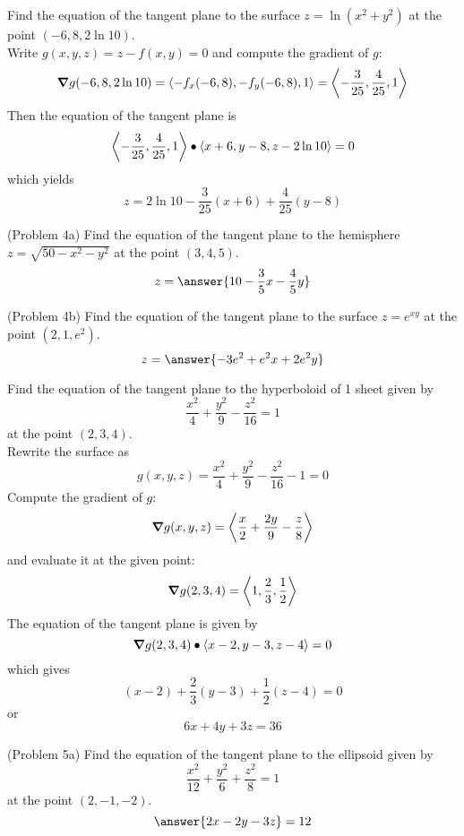 \documentclass[handout]{ximera}
\begin{document}
\begin{example}[Example 4]
Find the equation of the tangent plane to the surface $z = \ln(x^2 + y^2)$ at the point $(-6, 8, 2\ln 10)$.\\
Write $g(x, y, z) = z - f(x,y) = 0$ and compute the gradient of $g$:
\[
\boldsymbol\nabla g(-6, 8, 2\ln 10) = \left\langle -f_x(-6, 8), -f_y(-6, 8), 1\right\rangle = \left\langle -\frac{3}{25}, \frac{4}{25}, 1\right\rangle
\]
Then the equation of the tangent plane is
\[
\left\langle -\frac{3}{25}, \frac{4}{25}, 1\right\rangle \bullet \left\langle x+6, y-8, z-2\ln 10\right\rangle = 0
\]
which yields
\[
z = 2\ln 10 - \frac{3}{25}(x+6) +\frac{4}{25}(y-8)
\]
\end{example}

\begin{problem}(Problem 4a)
Find the equation of the tangent plane to the hemisphere $z = \sqrt{50 -x^2 - y^2}$ at the point $(3, 4, 5)$.\\
\[
z = \answer{10-\frac35 x - \frac45 y}
\]

\end{problem}


\begin{problem}(Problem 4b)
Find the equation of the tangent plane to the surface $z =e^{xy}$ at the point $(2, 1, e^2)$.\\
\[
z = \answer{-3e^2 + e^2 x + 2e^2 y}
\]
\end{problem}

\begin{example}[Example 5]
Find the equation of the tangent plane to the hyperboloid of 1 sheet given by 
\[
\frac{x^2}{4} + \frac{y^2}{9} - \frac{z^2}{16} = 1
\]
at the point $(2, 3, 4)$.\\
Rewrite the surface as
\[
g(x,y,z) = \frac{x^2}{4} + \frac{y^2}{9} - \frac{z^2}{16} - 1 = 0
\]
Compute the gradient of $g$:
\[
\boldsymbol\nabla g(x,y,z) = \left\langle \frac{x}{2} + \frac{2y}{9} - \frac{z}{8}\right\rangle
\]
and evaluate it at the given point:
\[
\boldsymbol\nabla g(2,3,4) = \left\langle 1, \frac{2}{3}, \frac12\right\rangle
\]
The equation of the tangent plane is given by 
\[
\boldsymbol\nabla g(2, 3, 4) \bullet \left\langle x-2, y-3, z-4\right\rangle = 0
\]
which gives
\[
(x-2) + \frac23 (y-3) + \frac12 (z-4) = 0
\]
or
\[
6x + 4y + 3z = 36
\]
\end{example}

\begin{problem}(Problem 5a)
Find the equation of the tangent plane to the ellipsoid given by 
\[
\frac{x^2}{12} + \frac{y^2}{6} + \frac{z^2}{8} = 1
\]
at the point $(2, -1, -2)$.\\
\[
\answer{2x-2y-3z} = 12
\]
\end{problem}
\end{document}
